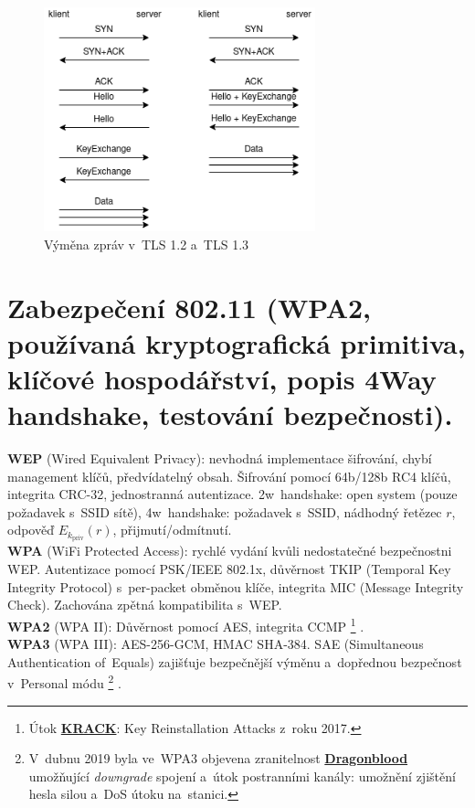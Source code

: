 \begin{figure}[ht]
\centering
\includegraphics[width=0.7\textwidth]{images/tls}
\caption*{Výměna zpráv v~TLS 1.2 a~TLS 1.3}
\end{figure}

\clearpage
\section{Zabezpečení 802.11 (WPA2, používaná kryptografická primitiva, klíčové hospodářství, popis 4Way handshake, testování bezpečnosti).}

\textbf{WEP} (Wired Equivalent Privacy): nevhodná implementace šifrování, chybí management klíčů, předvídatelný obsah. Šifrování pomocí 64b/128b RC4 klíčů, integrita CRC-32, jednostranná autentizace. 2w~handshake: open system (pouze požadavek s~SSID sítě), 4w~handshake: požadavek s~SSID, nádhodný řetězec $r$, odpověď $E_{k_\mathrm{priv}}(r)$, přijmutí/odmítnutí. \\
\textbf{WPA} (WiFi Protected Access): rychlé vydání kvůli nedostatečné bezpečnostni WEP. Autentizace pomocí PSK/IEEE 802.1x, důvěrnost TKIP (Temporal Key Integrity Protocol) s~per-packet obměnou klíče, integrita MIC (Message Integrity Check). Zachována zpětná kompatibilita s~WEP. \\
\textbf{WPA2} (WPA II): Důvěrnost pomocí AES, integrita CCMP%
\footnote{Útok \href{https://krackattacks.com}{\textbf{KRACK}}: Key Reinstallation Attacks z~roku 2017.}%
. \\
\textbf{WPA3} (WPA III): AES-256-GCM, HMAC SHA-384. SAE (Simultaneous Authentication of~Equals) zajišťuje bezpečnější výměnu a~dopřednou bezpečnost v~Personal módu%
\footnote{V~dubnu 2019 byla ve~WPA3 objevena zranitelnost \href{https://wpa3.mathyvanhoef.com/}{\textbf{Dragonblood}} umožňující \emph{downgrade} spojení a~útok postranními kanály: umožnění zjištění hesla silou a~DoS útoku na~stanici.}%
.

